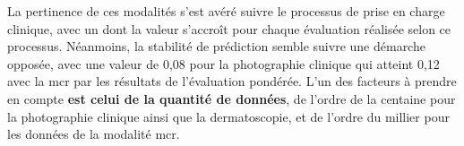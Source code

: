 

La pertinence de ces modalités s'est avéré suivre le processus de prise en charge clinique, avec un \fscore{} dont la valeur s'accroît pour chaque évaluation réalisée selon ce processus. Néanmoins, la stabilité de prédiction semble suivre une démarche opposée, avec une valeur de 0,08 pour la photographie clinique qui atteint 0,12 avec la \gls{mcr} par les résultats de l'évaluation pondérée. L'un des facteurs à prendre en compte \textbf{est celui de la quantité de données}, de l'ordre de la centaine pour la photographie clinique ainsi que la dermatoscopie, et de l'ordre du millier pour les données de la modalité \gls{mcr}.\par

